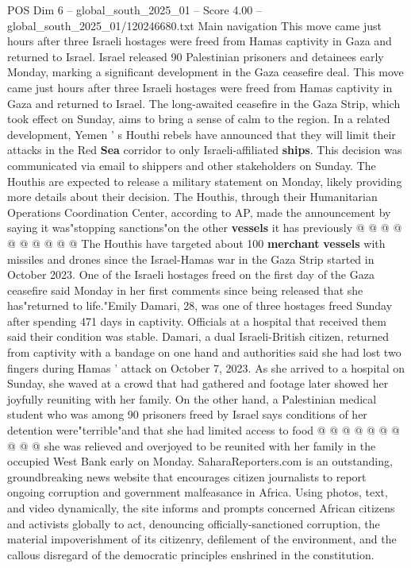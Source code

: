 \begin{textsample}{POS Dim 6 – global\_south\_2025\_01 – Score 4.00 – global\_south\_2025\_01/120246680.txt}  \label{ex:f6_pos_354}
Main navigation This move came just hours after three Israeli hostages were freed from Hamas captivity in Gaza and returned to Israel.
Israel released 90 Palestinian prisoners and detainees early Monday, marking a significant development in the Gaza ceasefire deal.
This move came just hours after three Israeli hostages were freed from Hamas captivity in Gaza and returned to Israel.
The long-awaited ceasefire in the Gaza Strip, which took effect on Sunday, aims to bring a sense of calm to the region.
In a related development, Yemen ' s Houthi rebels have announced that they will limit their attacks in the Red \textbf{Sea} corridor to only Israeli-affiliated \textbf{ships}.
This decision was communicated via email to shippers and other stakeholders on Sunday.
The Houthis are expected to release a military statement on Monday, likely providing more details about their decision.
The Houthis, through their Humanitarian Operations Coordination Center, according to AP, made the announcement by saying it was"stopping sanctions"on the other \textbf{vessels} it has previously @ @ @ @ @ @ @ @ @ @ The Houthis have targeted about 100 \textbf{merchant} \textbf{vessels} with missiles and drones since the Israel-Hamas war in the Gaza Strip started in October 2023.
One of the Israeli hostages freed on the first day of the Gaza ceasefire said Monday in her first comments since being released that she has"returned to life."Emily Damari, 28, was one of three hostages freed Sunday after spending 471 days in captivity.
Officials at a hospital that received them said their condition was stable.
Damari, a dual Israeli-British citizen, returned from captivity with a bandage on one hand and authorities said she had lost two fingers during Hamas ' attack on October 7, 2023.
As she arrived to a hospital on Sunday, she waved at a crowd that had gathered and footage later showed her joyfully reuniting with her family.
On the other hand, a Palestinian medical student who was among 90 prisoners freed by Israel says conditions of her detention were"terrible"and that she had limited access to food @ @ @ @ @ @ @ @ @ @ she was relieved and overjoyed to be reunited with her family in the occupied West Bank early on Monday.
SaharaReporters.com is an outstanding, groundbreaking news website that encourages citizen journalists to report ongoing corruption and government malfeasance in Africa.
Using photos, text, and video dynamically, the site informs and prompts concerned African citizens and activists globally to act, denouncing officially-sanctioned corruption, the material impoverishment of its citizenry, defilement of the environment, and the callous disregard of the democratic principles enshrined in the constitution.

\end{textsample}
